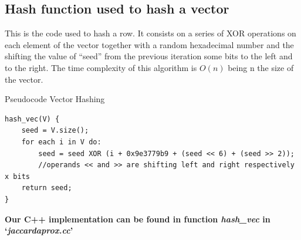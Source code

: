 \documentclass[12pt]{article}
\begin{document}
\subsection{Hash function used to hash a vector}
This is the code used to hash a row. It consists on a series of XOR operations on each element of the vector together with a random hexadecimal number and the shifting the value of ``seed'' from the previous iteration some bits to the left and to the right. The time complexity of this algorithm is $O(n)$ being n the size of the vector. 
\begin{center}
\begin{large}
Pseudocode Vector Hashing
\end{large}
\end{center}
 \begin{lstlisting}
hash_vec(V) {
	seed = V.size();
	for each i in V do:
		seed = seed XOR (i + 0x9e3779b9 + (seed << 6) + (seed >> 2));
		//operands << and >> are shifting left and right respectively x bits
	return seed;
}

\end{lstlisting}

\bigskip
\textbf{Our C++ implementation can be found in function \textit{hash\_vec} in `\textit{\mbox{jaccardaprox.cc}}'}
\end{document}
